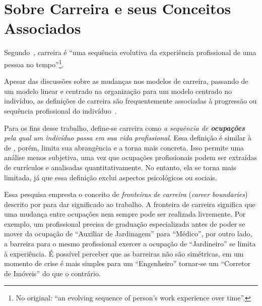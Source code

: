 \documentclass[
  article,
  11pt,
  a4paper,
  english,
  brazil,
  sumario=tradicional]{abntex2}
\begin{document}
\section{Sobre Carreira e seus Conceitos Associados} \label{sec:carreira}

Segundo~, carreira é \foreignquote{english}{uma sequência evolutiva da experiência profissional de uma pessoa no tempo}\footnote{No original: \enquote{an evolving sequence of person's work experience over time}.}.

Apesar das discussões sobre as mudanças nos modelos de carreira, passando de um modelo linear e centrado na organização para um modelo centrado no indivíduo, as definições de carreira são frequentemente associadas à progressão ou sequência profissional do indivíduo~\cite{Baruch2004-oy,Sullivan2009-xb,Bendassolli2009-bg}.

Para os fins desse trabalho, define-se carreira como \textit{a sequência de \textbf{ocupações} pela qual um indivíduo passa em sua vida profissional}. Essa definição é similar à de , porém, limita sua abrangência e a torna mais concreta. Isso permite uma análise menos subjetiva, uma vez que ocupações profissionais podem ser extraídas de currículos e analisadas quantitativamente. No entanto, ela se torna mais limitada, já que essa definição exclui aspectos psicológicos ou sociais.

Essa pesquisa empresta o conceito de \textit{fronteiras de carreira} (\textit{career boundaries}) descrito por  para dar significado ao trabalho. A fronteira de carreira significa que uma mudança entre ocupações nem sempre pode ser realizada livremente. Por exemplo, um profissional precisa de graduação especializada antes de poder se mover da ocupação de \enquote{Auxiliar de Jardinagem} para \enquote{Médico}, por outro lado, a barreira para o mesmo profissional exercer a ocupação de \enquote{Jardineiro} se limita à experiência. É possível perceber que as barreiras não são simétricas, em um momento de crise é mais simples para um \enquote{Engenheiro} tornar-se um \enquote{Corretor de Imóveis} do que o contrário.
\end{document}
